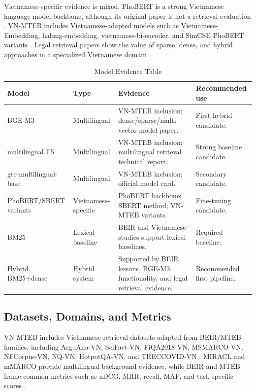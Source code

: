 \documentclass[11pt]{article}
\begin{document}
Vietnamese-specific evidence is mixed. PhoBERT is a strong Vietnamese language-model backbone, although its original paper is not a retrieval evaluation \cite{nguyen-tuan-nguyen-2020-phobert}. VN-MTEB includes Vietnamese-adapted models such as Vietnamese-Embedding, halong-embedding, vietnamese-bi-encoder, and SimCSE PhoBERT variants \cite{pham-etal-2026-vn}. Legal retrieval papers show the value of sparse, dense, and hybrid approaches in a specialized Vietnamese domain \cite{khang-etal-2024-vietnamese-legal,ba-etal-2024-vietnamese-legal-ir}.

\begin{table}[H]
\centering
\caption{Model Evidence Table}
\label{tab:model-evidence}
\small
\begin{tabularx}{\textwidth}{p{}p{}Y p{0.22\textwidth}}
\toprule
Model & Type & Evidence & Recommended use \\
\midrule
BGE-M3 & Multilingual & VN-MTEB inclusion; dense/sparse/multi-vector model paper. & First hybrid candidate. \\
multilingual E5 & Multilingual & VN-MTEB inclusion; multilingual retrieval technical report. & Strong baseline candidate. \\
gte-multilingual-base & Multilingual & VN-MTEB inclusion; official model card. & Secondary candidate. \\
PhoBERT/SBERT variants & Vietnamese-specific & PhoBERT backbone; SBERT method; VN-MTEB variants. & Fine-tuning candidate. \\
BM25 & Lexical baseline & BEIR and Vietnamese studies support lexical baselines. & Required baseline. \\
Hybrid BM25+dense & Hybrid system & Supported by BEIR lessons, BGE-M3 functionality, and legal retrieval evidence. & Recommended first pipeline. \\
\bottomrule
\end{tabularx}
\end{table}

\subsection{Datasets, Domains, and Metrics}
VN-MTEB includes Vietnamese retrieval datasets adapted from BEIR/MTEB families, including ArguAna-VN, SciFact-VN, FiQA2018-VN, MSMARCO-VN, NFCorpus-VN, NQ-VN, HotpotQA-VN, and TRECCOVID-VN \cite{pham-etal-2026-vn}. MIRACL and mMARCO provide multilingual background evidence, while BEIR and MTEB frame common metrics such as nDCG, MRR, recall, MAP, and task-specific scores \cite{zhang-etal-2023-miracl,bonifacio-etal-2021-mmarco,thakur-etal-2021-beir,muennighoff-etal-2023-mteb}.
\end{document}
